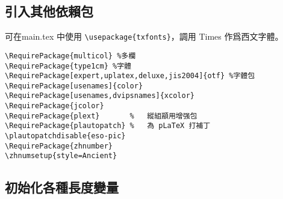 \subsection{引入其他依賴包}
\par%
可在main.tex 中使用 \verb+\usepackage{txfonts}+，調用 Times 作爲西文字體。

\begin{lstlisting}[firstnumber=219]
\RequirePackage{multicol} %多欄
\RequirePackage{type1cm} %字體
\RequirePackage[expert,uplatex,deluxe,jis2004]{otf} %字體包
\RequirePackage[usenames]{color}
\RequirePackage[usenames,dvipsnames]{xcolor}
\RequirePackage{jcolor}
\RequirePackage{plext}       %   縱組顓用增强包
\RequirePackage{plautopatch} %   為 pLaTeX 打補丁
\plautopatchdisable{eso-pic}
\RequirePackage{zhnumber}
\zhnumsetup{style=Ancient}
\end{lstlisting}

\subsection{初始化各種長度變量}

